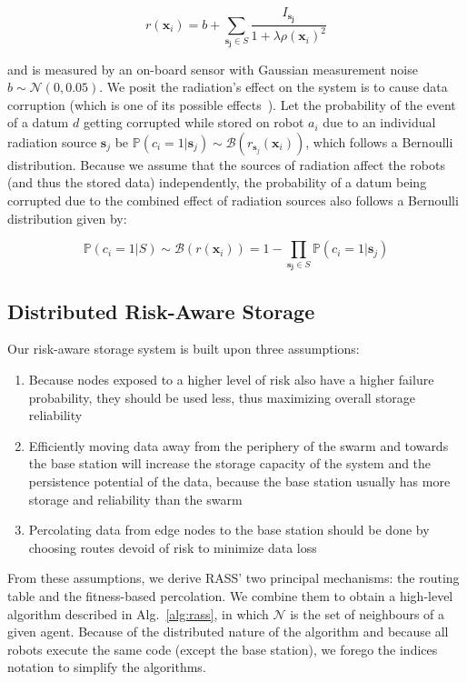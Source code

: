 \begin{equation}
    r(\bm{x}_i) = b + \sum_{\bm{s_j} \in S} \frac{I_{\bm{s_j}}}{1 + \lambda\rho(\bm{x}_i)^2}
    \label{eq:radiation}
\end{equation}

and is measured by an on-board sensor with Gaussian measurement noise
$b \sim \mathcal{N}(0, 0.05)$. We posit the radiation's effect on the system is to cause 
data corruption (which is one of its possible effects~\cite{messenger1986effects}). Let the 
probability of the event of a datum $d$ getting corrupted while stored on robot $a_i$ due 
to an individual radiation  source $\bm{s}_j$ be
$\mathbb{P}(c_i = 1 | \bm{s}_j) \sim
\mathcal{B}(r_{\bm{s}_j}(\bm{x}_i))$, which follows a Bernoulli
distribution. Because we assume that the sources of radiation affect
the robots (and thus the stored data) independently, the probability of a datum being 
corrupted due to the combined effect of radiation sources also follows a Bernoulli 
distribution given by:

\begin{equation}
    \mathbb{P}(c_i = 1 | S) \sim \mathcal{B}(r(\bm{x}_i)) = 1 - \prod_{\bm{s_j} \in S} \mathbb{P}(c_i = 1 | \bm{s}_j)
    \label{eq:failure}
\end{equation}

\subsection{Distributed Risk-Aware Storage}
Our risk-aware storage system is built upon three assumptions:

\begin{enumerate}
\item Because nodes exposed to a higher level of risk also have a higher
  failure probability, they should be used less, thus
  maximizing overall storage reliability
\item Efficiently moving data away from the periphery of the swarm and
  towards the base station will increase the storage capacity of the
  system and the persistence potential of the data, because the base
  station usually has more storage and reliability than the swarm
\item Percolating data from edge nodes to the base station should be
  done by choosing routes devoid of risk to minimize data loss
\end{enumerate}
From these assumptions, we derive \ac{RASS}' two principal mechanisms: the routing table and the fitness-based percolation. We combine them to obtain a high-level algorithm described in Alg.~\ref{alg:rass}, in which $\mathcal{N}$ is the set of neighbours of a given agent. Because of the distributed nature of the algorithm and because all robots execute the same code (except the base station), we forego the indices notation to simplify the algorithms.


